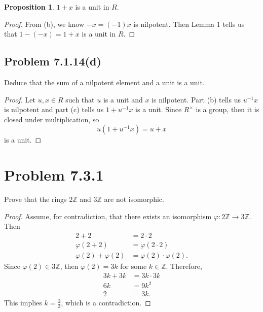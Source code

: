 \documentclass[12pt]{article}
\newenvironment{problem}
    {\begin{lrbox}{\mybox}\begin{minipage}{0.98\textwidth}}
    {\end{minipage}\end{lrbox}\begin{center}\framebox[\textwidth]{\usebox{\mybox}}\end{center}}
\theoremstyle{definition}
\newtheorem{proposition}{Proposition}
\newcommand{\Z}{\mathbb{Z}}
\renewcommand{\phi}{\varphi}
\begin{document}
\begin{proposition}
    $1 + x$ is a unit in $R$.
\end{proposition}

\begin{proof}
    From (b), we know $-x = (-1)x$ is nilpotent. Then Lemma 1 tells us that $1 - (-x) = 1 + x$ is a unit in $R$.
    
\end{proof}

\subsection{Problem 7.1.14(d)}
\begin{problem}
    Deduce that the sum of a nilpotent element and a unit is a unit.
\end{problem}

\begin{proof}
    Let $u, x \in R$ such that $u$ is a unit and $x$ is nilpotent. Part (b) tells us $u^{-1}x$ is nilpotent and part (c) tells us $1 + u^{-1}x$ is a unit. Since $R^\times$ is a group, then it is closed under multiplication, so
    \[
        u(1 + u^{-1}x) = u + x
    \]
    is a unit.
    
\end{proof}

\newpage
\section{Problem 7.3.1}
\begin{problem}
    Prove that the rings $2\Z$ and $3\Z$ are not isomorphic.
\end{problem}

\begin{proof}
    Assume, for contradiction, that there exists an isomorphism $\phi : 2\Z \to 3\Z$. Then
    \begin{align*}
        2 + 2 &=  2 \cdot 2 \\
        \phi(2 + 2) &= \phi(2 \cdot 2) \\
        \phi(2) + \phi(2) &= \phi(2) \cdot \phi(2).
    \end{align*}
    Since $\phi(2) \in 3\Z$, then $\phi(2) = 3k$ for some $k \in \Z$. Therefore,
    \begin{align*}
        3k + 3k &= 3k \cdot 3k \\
        6k &= 9k^2 \\
        2 &= 3k.
    \end{align*}
    This implies $k = \frac23$, which is a contradiction.
    
\end{proof}
\end{document}
